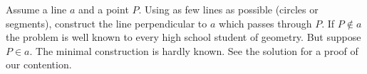 Assume a line $a$ and a point $P$. Using as few lines as possible (circles or segments), construct the line perpendicular to $a$ which passes through $P$. If $P \notin a$ the problem is well known to every high school student of geometry. But suppose $P \in a$. The minimal construction is hardly known. See the solution for a proof of our contention.
